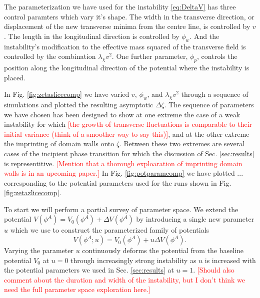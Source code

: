 The parameterization we have used for the instability \eqref{eq:DeltaV} has three control paramters which vary it's shape. The width in the transverse direction, or displacement of the new transverse minima from the centre line, is controlled by $v$. The length in the longitudinal direction is controlled by $\phi_w$. And the instability's modification to the effective mass squared of the transverse field is controlled by the combination $\lambda_\chi v^2$. One further parameter, $\phi_p$, controls the position along the longitudinal direction of the potential where the instability is placed.

In Fig. \ref{fig:zetaslicecomp} we have varied $v$, $\phi_w$, and $\lambda_\chi v^2$ through a sequence of simulations and plotted the resulting asymptotic $\Delta\zeta$. The sequence of parameters we have chosen has been designed to show at one extreme the case of a weak instability for which \textcolor{red}{[the growth of transverse fluctuations is comparable to their initial variance (think of a smoother way to say this)]}, and at the other extreme the imprinting of domain walls onto $\zeta$. Between these two extremes are several cases of the incipient phase transition for which the discussion of Sec. \ref{sec:results} is representitive.
\textcolor{red}{[Mention that a thorough exploaration of imprinting domain walls is in an upcoming paper.]}
In Fig. \ref{fig:potparamcomp} we have plotted ... corresponding to the potential parameters used for the runs shown in Fig. \ref{fig:zetazlicecomp}.


% 


To start we will perform a partial survey of parameter space. We extend the potential $V(\phi^A) = V_0(\phi^A) + \Delta V(\phi^A)$ by introducing a single new parameter $u$ which we use to construct the parameterized family of potentials
\begin{equation}
  V(\phi^A;u) = V_0(\phi^A) + u\Delta V(\phi^A).
\end{equation}
Varying the parameter $u$ continuously deforms the potential from the baseline potential $V_0$ at $u=0$ through increasingly strong instability as $u$ is increased with the potential parameters we used in Sec. \ref{sec:results} at $u=1$. \textcolor{red}{[Should also comment about the duration and width of the instability, but I don't think we need the full parameter space exploration here.]}


